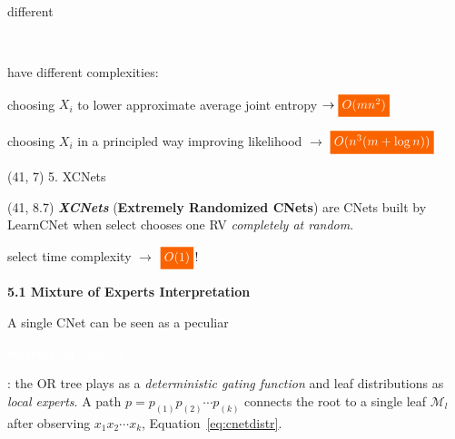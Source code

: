 \documentclass[final]{beamer}
\newcommand{\highlight}[2][yellow]{\mathchoice%
  {\colorbox{#1}{\strut\textcolor{white}{$\displaystyle{#2}$}}}%
  {\colorbox{#1}{\strut\textcolor{white}{$\textstyle{#2}$}}}%
  {\colorbox{#1}{\strut\textcolor{white}{$\scriptstyle{#2}$}}}%
  {\colorbox{#1}{\strut\textcolor{white}{$\scriptscriptstyle{#2}$}}}}%
\newcommand{\highlighttext}[2][yellow]{{\colorbox{#1}{\strut\textcolor{white}{#2}}}}
\begin{document}
\begin{frame}{}
\begin{textblock}{17.5}
\begin{center}
\begin{minipage}{0.9\linewidth}
\end{minipage}
\end{center}
\vspace{10pt}
    different \highlighttext[gold4]{\textsf{select} implementations}
    have different complexities:
    \vspace{10pt}

    \begin{center}
      \begin{minipage}{0.9\linewidth}
        \begin{description}[align=parright]
        \item[\textbf{\textsf{entCNet}}~\cite{Rahman2014}] choosing
          $X_{i}$ to lower approximate average joint entropy
          {\hfill $\rightarrow\highlight[gold4]{O(mn^2)}$}
        \item[\textbf{\textsf{dCSN}}~\cite{DiMauro2015a}] choosing
          $X_{i}$ in a principled way improving likelihood
          {\hfill $\rightarrow$ $\highlight[gold4]{O(n^3(m + \log n))}$}
        \end{description}
      \end{minipage}
    \end{center}
    
  \end{textblock}





  \begin{textblock}{17.5}(41, 7)
    5. XCNets
  \end{textblock}
  \begin{textblock}{17.5}(41, 8.7)
    \small
    \emph{\textbf{XCNets}} (\textbf{Extremely Randomized CNets}) are CNets built by \textsf{LearnCNet} when
    \textsf{select} chooses one RV \emph{completely at random}.\par
    {\hfill\textsf{select} time complexity $\rightarrow$ $\highlight[gold4]{O(1)}$!}
    \vspace{20pt}


    {\bf 5.1 Mixture of Experts Interpretation}\par
    A single CNet can be seen as a peculiar \highlighttext[lacamlilac]{\textbf{\emph{mixture of experts}}}: the OR
    tree plays as a \emph{deterministic gating function} and leaf distributions
    as \emph{local experts}.\newline
    A path $p=p_{(1)}p_{(2)}\cdots p_{(k)}$ connects the root to a
    single leaf $\mathcal{M}_{l}$ after observing $x_{1} x_{2} \cdots  x_{k}$,
     Equation~\ref{eq:cnetdistr}.


\end{textblock}
\end{frame}
\end{document}
